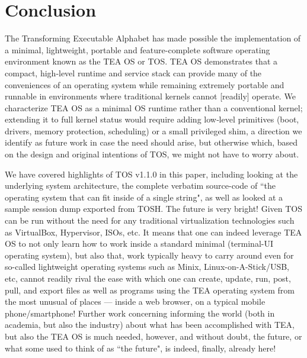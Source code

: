 \documentclass{article}
\begin{document}
\section{Conclusion}
\label{SECTOSConc}

The Transforming Executable Alphabet has made possible the implementation of a minimal, lightweight, portable and feature-complete software operating environment known as the TEA OS or TOS. TEA OS demonstrates that a compact, high‑level runtime and service stack can provide many of the conveniences of an operating system while remaining extremely portable and runnable in environments where traditional kernels cannot [readily] operate.  We characterize TEA OS as a minimal OS runtime rather than a conventional kernel; extending it to full kernel status would require adding low‑level primitives (boot, drivers, memory protection, scheduling) or a small privileged shim, a direction we identify as future work in case the need should arise, but otherwise which, based on the design and original intentions of TOS, we might not have to worry about.

We have covered highlights of TOS v1.1.0 in this paper, including looking at the underlying system architecture, the complete verbatim source-code of ``the operating system that can fit inside of a single string", as well as looked at a sample session dump exported from TOSH. The future is very bright! Given TOS can be run without the need for any traditional virtualization technologies such as VirtualBox, Hypervisor, ISOs, etc. It means that one can indeed leverage TEA OS to not only learn how to work inside a standard minimal (terminal-UI operating system), but also that, work typically heavy to carry around even for so-called lightweight operating systems such as Minix, Linux-on-A-Stick/USB, etc, cannot readily rival the ease with which one can create, update, run, post, pull, and export files as well as programs using the TEA operating system from the most unusual of places --- inside a web browser, on a typical mobile phone/smartphone! Further work concerning informing the world (both in academia, but also the industry) about what has been accomplished with TEA, but also the TEA OS is much needed, however, and without doubt, the future, or what some used to think of as ``the future", is indeed, finally, already here!




\end{document}
